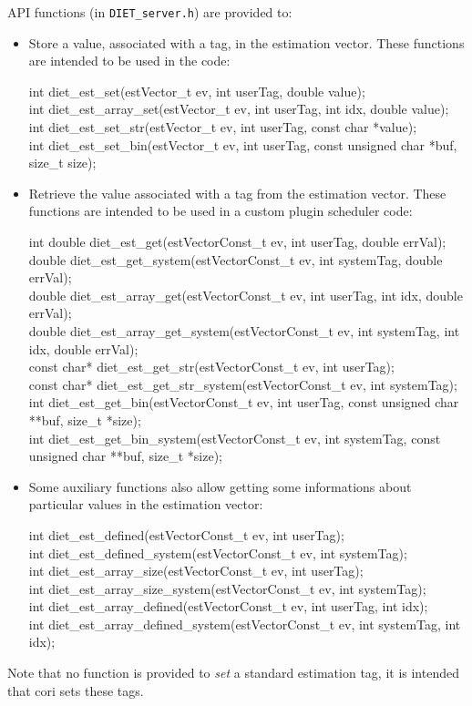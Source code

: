 API functions (in \verb+DIET_server.h+) are provided to:
\begin{itemize}
\item Store a value, associated with a tag, in the estimation vector. These
  functions are intended to be used in the \sed code:
\begin{code}
int diet\_est\_set(estVector\_t ev, int userTag, double value); \\
int diet\_est\_array\_set(estVector\_t ev, int userTag, int idx, double value); \\
int diet\_est\_set\_str(estVector\_t ev, int userTag, const char *value); \\
int diet\_est\_set\_bin(estVector\_t ev, int userTag, const unsigned char *buf, size\_t size);
\end{code}
\item Retrieve the value associated with a tag from the estimation
  vector. These functions are intended to be used in a custom plugin scheduler
  code:
\begin{code}
int double diet\_est\_get(estVectorConst\_t ev, int userTag, double errVal); \\
double diet\_est\_get\_system(estVectorConst\_t ev, int systemTag, double errVal); \\
double diet\_est\_array\_get(estVectorConst\_t ev, int userTag, int idx, double errVal); \\
double diet\_est\_array\_get\_system(estVectorConst\_t ev, int systemTag, int idx, double errVal); \\
const char* diet\_est\_get\_str(estVectorConst\_t ev, int userTag); \\
const char* diet\_est\_get\_str\_system(estVectorConst\_t ev, int systemTag); \\
int diet\_est\_get\_bin(estVectorConst\_t ev, int userTag, const unsigned char **buf, size\_t *size); \\
int diet\_est\_get\_bin\_system(estVectorConst\_t ev, int systemTag, const unsigned char **buf, size\_t *size);
\end{code}
\item Some auxiliary functions also allow getting some informations about particular values in the estimation vector:
\begin{code}
int diet\_est\_defined(estVectorConst\_t ev, int userTag); \\
int diet\_est\_defined\_system(estVectorConst\_t ev, int systemTag); \\
int diet\_est\_array\_size(estVectorConst\_t ev, int userTag); \\
int diet\_est\_array\_size\_system(estVectorConst\_t ev, int systemTag); \\
int diet\_est\_array\_defined(estVectorConst\_t ev, int userTag, int idx); \\
int diet\_est\_array\_defined\_system(estVectorConst\_t ev, int systemTag, int idx);
\end{code}
\end{itemize}
Note that no function is provided to \textit{set} a standard estimation tag, it
is intended that cori sets these tags.

